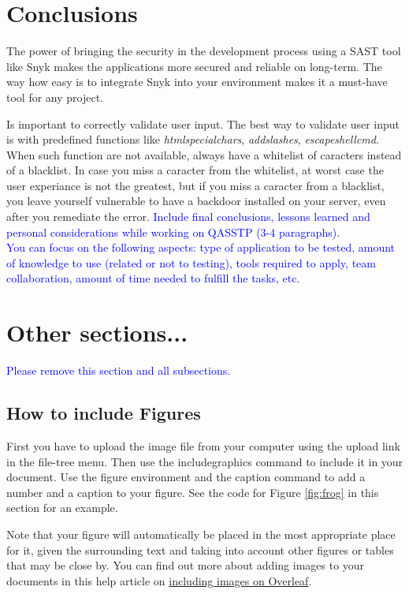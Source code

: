 \documentclass{article}
\begin{document}
\section{Conclusions}
\label{}
\par The power of bringing the security in the development process using a SAST tool like Snyk makes the applications more secured and reliable on long-term. The way how easy is to integrate Snyk into your environment makes it a must-have tool for any project.

Is important to correctly validate user input. The best way to validate user input is with predefined functions like \textit{htmlspecialchars}, \textit{addslashes}, \textit{escapeshellcmd}.
When such function are not available, always have a whitelist of caracters instead of a blacklist.
In case you miss a caracter from the whitelist, at worst case the user experiance is not the greatest, but if you miss a caracter from a blacklist, you leave yourself vulnerable to have a backdoor installed on your server, even after you remediate the error.
\textcolor{blue}{Include final conclusions, lessons learned and personal considerations while working on QASSTP (3-4 paragraphs).\\
    You can focus on the following aspects: type of application to be tested, amount of knowledge to use (related or not to testing), tools required to apply, team collaboration, amount of time needed to fulfill the tasks, etc.}

\section{Other sections...}

\textcolor{blue}{Please remove this section and all subsections.}
\subsection{How to include Figures}

First you have to upload the image file from your computer using the upload link in the file-tree menu. Then use the includegraphics command to include it in your document. Use the figure environment and the caption command to add a number and a caption to your figure. See the code for Figure \ref{fig:frog} in this section for an example.

Note that your figure will automatically be placed in the most appropriate place for it, given the surrounding text and taking into account other figures or tables that may be close by. You can find out more about adding images to your documents in this help article on \href{https://www.overleaf.com/learn/how-to/Including_images_on_Overleaf}{including images on Overleaf}.
\end{document}
